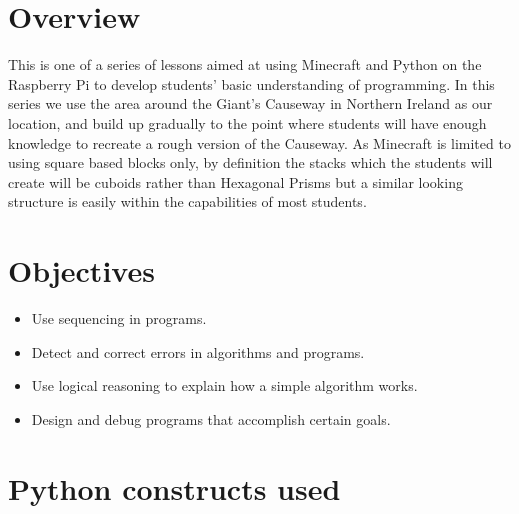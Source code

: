 \documentclass{geocraft-lesson-plan}
\begin{document}
\subtitle{Part 1 - Sequencing}

\section*{Overview} This is one of a series of lessons aimed at using Minecraft and Python on the Raspberry Pi to
develop students' basic understanding of programming. In this series we use the area around the Giant's Causeway in 
Northern Ireland as our location, and build up gradually to the point where students will have enough knowledge to
recreate a rough version of the Causeway. As Minecraft is limited to using square based blocks only, by definition the
stacks which the students will create will be cuboids rather than Hexagonal Prisms but a similar looking structure is
easily within the capabilities of most students.

\section*{Objectives}

\begin{itemize}
\item Use sequencing in programs.
\item Detect and correct errors in algorithms and programs.
\item Use logical reasoning to explain how a simple algorithm works.
\item Design and debug programs that accomplish certain goals.
\end{itemize}



\section*{Python constructs used}
\end{document}
